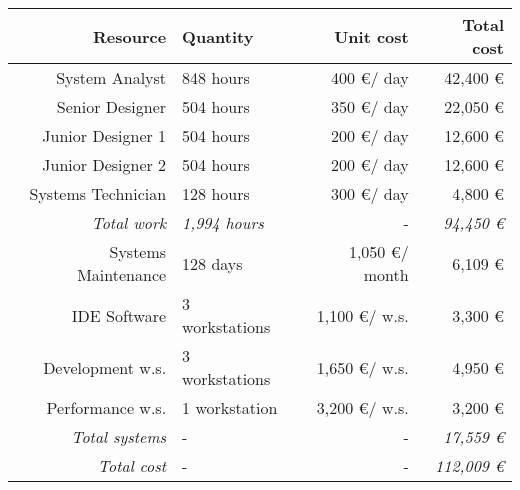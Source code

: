 \begin{tabular}{r|lr|r}
\textbf{Resource} & \textbf{Quantity} & \textbf{Unit cost} & \textbf{Total cost} \\ \hline
System Analyst & 848 hours & 400 \euro / day & 42,400 \euro \\
Senior Designer & 504 hours & 350 \euro / day & 22,050 \euro \\
Junior Designer 1 & 504 hours & 200 \euro / day & 12,600 \euro \\
Junior Designer 2 & 504 hours & 200 \euro / day & 12,600 \euro \\
Systems Technician & 128 hours & 300 \euro / day & 4,800 \euro \\ \hline
\textit{Total work} & \textit{1,994 hours} & - & \textit{94,450 \euro} \\ \hline \hline
Systems Maintenance & 128 days & 1,050 \euro / month & 6,109 \euro \\
IDE Software & 3 workstations & 1,100 \euro / w.s. & 3,300 \euro \\
Development w.s. & 3 workstations & 1,650 \euro / w.s. & 4,950 \euro \\
Performance w.s. & 1 workstation & 3,200 \euro / w.s. & 3,200 \euro \\ \hline
\textit{Total systems} & - & - & \textit{17,559 \euro} \\ \hline \hline
\textit{Total cost} & - & - & \textit{112,009 \euro}

\end{tabular}
